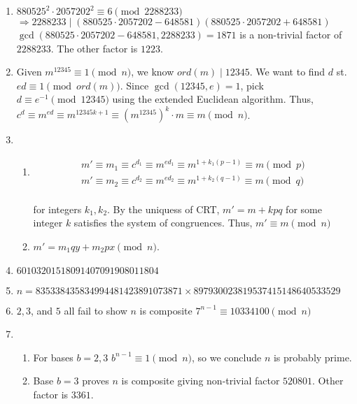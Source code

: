 \documentclass[10pt]{article}
\begin{document}
\begin{enumerate}[label= \arabic*.]
\begin{enumerate}
    \end{enumerate}
    \item $880525^2\cdot 2057202^2\equiv 6\pmod{2288233}$\\
    $\Rightarrow 2288233\mid(880525\cdot 2057202-648581)(880525\cdot 2057202+648581)$\\
    $\gcd(880525\cdot 2057202-648581,2288233)=1871$ is a non-trivial factor of $2288233$. The other factor is $1223$.
    \item Given $m^{12345}\equiv 1\pmod{n}$, we know $ord(m)\mid 12345$.
    We want to find $d$ st. $ed\equiv 1\pmod{ord(m)}$. 
    Since $\gcd(12345,e)=1$, pick $d\equiv e^{-1}\pmod{12345}$ using the extended Euclidean algorithm.
    Thus, $c^d\equiv m^{ed}\equiv m^{12345k+1}\equiv {(m^{12345})}^k\cdot m\equiv m\pmod{n}$.
    \item 
    \begin{enumerate}
            \item \begin{align*}
                m'\equiv m_1\equiv c^{d_1}\equiv m^{ed_1}\equiv m^{1+k_1(p-1)}\equiv m\pmod{p}\\
                m'\equiv m_2\equiv c^{d_2}\equiv m^{ed_2}\equiv m^{1+k_2(q-1)}\equiv m\pmod{q}
            \end{align*}\\
            for integers $k_1,k_2$.
            By the uniquess of CRT, $m'=m+kpq$ for some integer $k$ satisfies the system of congruences. Thus, $m'\equiv m\pmod{n}$
            \item $m'=m_1qy+m_2px\pmod{n}$.
    \end{enumerate}
    \item $60103201518091407091908011804$
    \item $n=835338435834994481423891073871\times 897930023819537415148640533529$
    \item $2,3$, and $5$ all fail to show $n$ is composite $7^{n-1}\equiv 10334100\pmod{n}$
    \item \begin{enumerate}
        \item For bases $b=2,3$ $b^{n-1}\equiv 1\pmod{n}$, so we conclude $n$ is probably prime.
        \item Base $b=3$ proves $n$ is composite giving non-trivial factor $520801$. Other factor is $3361$.
    \end{enumerate}
\end{enumerate}

\end{document}
